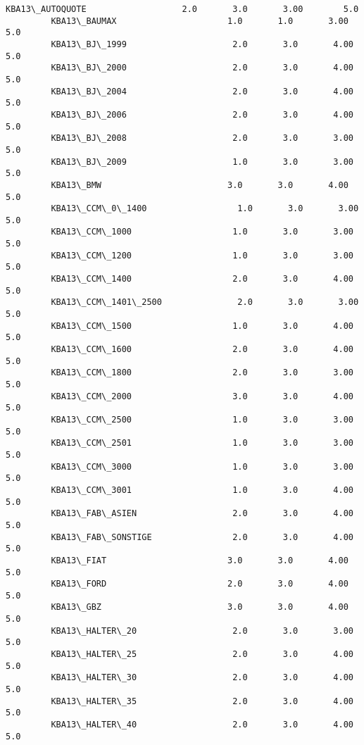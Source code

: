 \documentclass[11pt]{article}
\begin{document}
\begin{Verbatim}[commandchars=\\\{\}]
         KBA13\_AUTOQUOTE                   2.0       3.0       3.00        5.0  
         KBA13\_BAUMAX                      1.0       1.0       3.00        5.0  
         KBA13\_BJ\_1999                     2.0       3.0       4.00        5.0  
         KBA13\_BJ\_2000                     2.0       3.0       4.00        5.0  
         KBA13\_BJ\_2004                     2.0       3.0       4.00        5.0  
         KBA13\_BJ\_2006                     2.0       3.0       4.00        5.0  
         KBA13\_BJ\_2008                     2.0       3.0       3.00        5.0  
         KBA13\_BJ\_2009                     1.0       3.0       3.00        5.0  
         KBA13\_BMW                         3.0       3.0       4.00        5.0  
         KBA13\_CCM\_0\_1400                  1.0       3.0       3.00        5.0  
         KBA13\_CCM\_1000                    1.0       3.0       3.00        5.0  
         KBA13\_CCM\_1200                    1.0       3.0       3.00        5.0  
         KBA13\_CCM\_1400                    2.0       3.0       4.00        5.0  
         KBA13\_CCM\_1401\_2500               2.0       3.0       3.00        5.0  
         KBA13\_CCM\_1500                    1.0       3.0       4.00        5.0  
         KBA13\_CCM\_1600                    2.0       3.0       4.00        5.0  
         KBA13\_CCM\_1800                    2.0       3.0       3.00        5.0  
         KBA13\_CCM\_2000                    3.0       3.0       4.00        5.0  
         KBA13\_CCM\_2500                    1.0       3.0       3.00        5.0  
         KBA13\_CCM\_2501                    1.0       3.0       3.00        5.0  
         KBA13\_CCM\_3000                    1.0       3.0       3.00        5.0  
         KBA13\_CCM\_3001                    1.0       3.0       4.00        5.0  
         KBA13\_FAB\_ASIEN                   2.0       3.0       4.00        5.0  
         KBA13\_FAB\_SONSTIGE                2.0       3.0       4.00        5.0  
         KBA13\_FIAT                        3.0       3.0       4.00        5.0  
         KBA13\_FORD                        2.0       3.0       4.00        5.0  
         KBA13\_GBZ                         3.0       3.0       4.00        5.0  
         KBA13\_HALTER\_20                   2.0       3.0       3.00        5.0  
         KBA13\_HALTER\_25                   2.0       3.0       4.00        5.0  
         KBA13\_HALTER\_30                   2.0       3.0       4.00        5.0  
         KBA13\_HALTER\_35                   2.0       3.0       4.00        5.0  
         KBA13\_HALTER\_40                   2.0       3.0       4.00        5.0  

\end{Verbatim}
\end{document}
